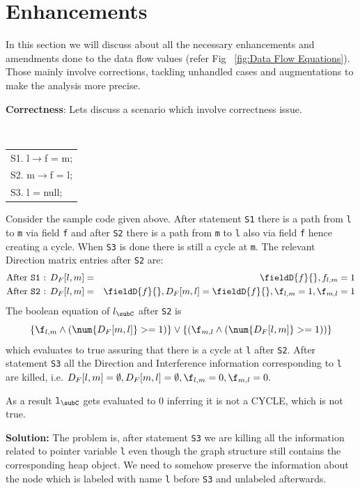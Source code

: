\section{Enhancements}

In this section we will discuss about all the necessary enhancements and amendments done to the data flow values 
(refer Fig ~\ref{fig:Data Flow Equations}). Those mainly involve corrections, tackling unhandled cases and augmentations
to make the analysis more precise.

\textbf{Correctness}:
Lets discuss a scenario which involve correctness issue.

{\small \tt
\begin{center}
    \begin{tabular}[b]{l}
      S1. l$\rightarrow$f = m; \\
      S2. m$\rightarrow$f = l; \\
      S3. l = null;
    \end{tabular}
\end{center}
  }

\begin{example}
Consider the sample code given above. After statement {\tt S1} there is a path from {\tt l} to {\tt m} via field {\tt f} and 
after {\tt S2} there is a path from {\tt m} to {\tt l} also via field {\tt f} hence creating a cycle.
When {\tt S3} is done there is still a cycle at {\tt m}. The relevant Direction matrix entries after {\tt S2} are: 
\begin{eqnarray*}
\mbox{After {\tt S1} : }  D_{F}[l,m] &=& \fieldD{f}{} , f_{l,m} = 1  \\
\mbox{After {\tt S2} : }    D_F[l,m] &=& \fieldD{f}{} , D_F[m,l] = \fieldD{f}{} , \f_{l,m} = 1 , \f_{m,l} = 1  
\end{eqnarray*}
The boolean equation of $l_{\subC}$ after {\tt S2} is 
\[
\{ \f_{l,m} \wedge ( \num{D_F[m,l]} >= 1) \} \vee \{  (\f_{m,l} \wedge   ( \num{D_F[l,m]} >= 1)) \}   
\]
which evaluates to true assuring that there is a cycle at {\tt l} after {\tt S2}. After statement {\tt S3} all the Direction and 
Interference information corresponding to {\tt l} are killed, i.e. 
$D_F[l,m]= \emptyset , D_F[m,l]= \emptyset , \f_{l,m}=0 , \f_{m,l}=0.$ 

As a result  ${\tt l}_{\subC}$ gets evaluated to 0 inferring it is not a CYCLE, which is not true.
\end{example}      

\textbf{Solution:} The problem is, after statement {\tt S3} we are killing all the information related to pointer variable {\tt l}
even though the graph structure still contains the corresponding heap object. We need to somehow preserve the information about the node 
which is labeled with name {\tt l} before {\tt S3} and unlabeled afterwards.

